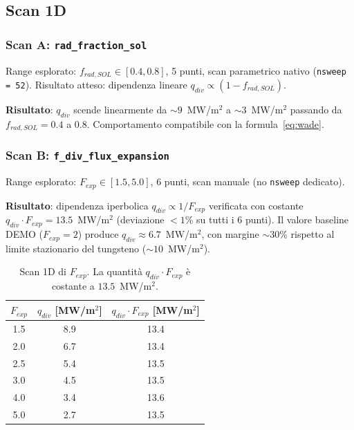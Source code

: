 \subsection{Scan 1D}

\subsubsection{Scan A: \texttt{rad\_fraction\_sol}}

Range esplorato: $f_{rad,SOL} \in [0.4, 0.8]$, 5 punti, scan parametrico
nativo (\verb|nsweep = 52|). Risultato atteso: dipendenza lineare
$q_{div} \propto (1 - f_{rad,SOL})$.

\textbf{Risultato}: $q_{div}$ scende linearmente da $\sim 9$~MW/m$^2$ a
$\sim 3$~MW/m$^2$ passando da $f_{rad,SOL} = 0.4$ a $0.8$. Comportamento
compatibile con la formula~\eqref{eq:wade}.

\subsubsection{Scan B: \texttt{f\_div\_flux\_expansion}}

Range esplorato: $F_{exp} \in [1.5, 5.0]$, 6 punti, scan manuale (no
\verb|nsweep| dedicato).

\textbf{Risultato}: dipendenza iperbolica $q_{div} \propto 1/F_{exp}$
verificata con costante $q_{div} \cdot F_{exp} = 13.5$~MW/m$^2$
(deviazione $< 1\%$ su tutti i 6 punti). Il valore baseline DEMO
($F_{exp} = 2$) produce $q_{div} \approx 6.7$~MW/m$^2$, con margine
$\sim 30\%$ rispetto al limite stazionario del tungsteno
($\sim 10$~MW/m$^2$).

\begin{table}[h]
    \centering
    \caption{Scan 1D di $F_{exp}$. La quantità $q_{div} \cdot F_{exp}$
             è costante a $13.5$~MW/m$^2$.}
    \begin{tabular}{ccc}
        \toprule
        $F_{exp}$ & $q_{div}$ [MW/m$^2$] & $q_{div} \cdot F_{exp}$ [MW/m$^2$] \\
        \midrule
        1.5 &  8.9 & 13.4 \\
        2.0 &  6.7 & 13.4 \\
        2.5 &  5.4 & 13.5 \\
        3.0 &  4.5 & 13.5 \\
        4.0 &  3.4 & 13.6 \\
        5.0 &  2.7 & 13.5 \\
        \bottomrule
    \end{tabular}
\end{table}

